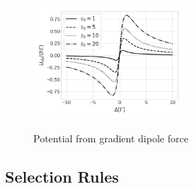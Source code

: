 {\begin{figure}[!ht]
	\centering
	\caption{Potential from gradient dipole force}
	\includegraphics[width=0.5\textwidth]{USPSC-img/gradient_dipole_potential.png}
	\label{fig:gradient-dipole-potential}
\end{figure}

\subsection{Selection Rules}
\label{sec:selection-rules}

}
